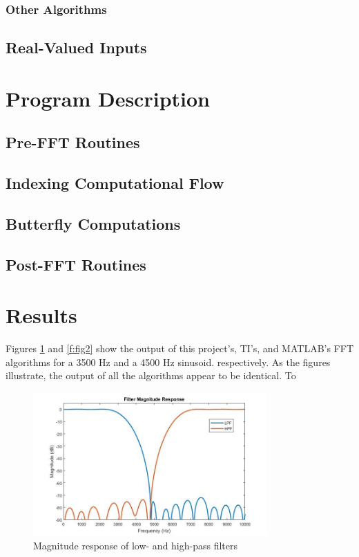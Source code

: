 \documentclass[11pt,pdftex,portrait,letterpaper]{article}
\begin{document}

\subsubsection{Other Algorithms}

\subsection{Real-Valued Inputs}

 
\section{Program Description}

\subsection{Pre-FFT Routines}

\subsection{Indexing Computational Flow}

\subsection{Butterfly Computations}

\subsection{Post-FFT Routines}


\section{Results}

 Figures \ref{f:fig1} and \ref{f:fig2} show the output of this project's, TI's, and MATLAB's FFT algorithms for a 3500 Hz and a 4500 Hz sinusoid. respectively. As the figures illustrate, the output of all the algorithms appear to be identical. To 

\begin{figure}[h]
\centering
\includegraphics[width=0.8\textwidth]{./filtMag}
\caption{Magnitude response of low- and high-pass filters}
\label{f:fig1}
\end{figure}
\end{document}
